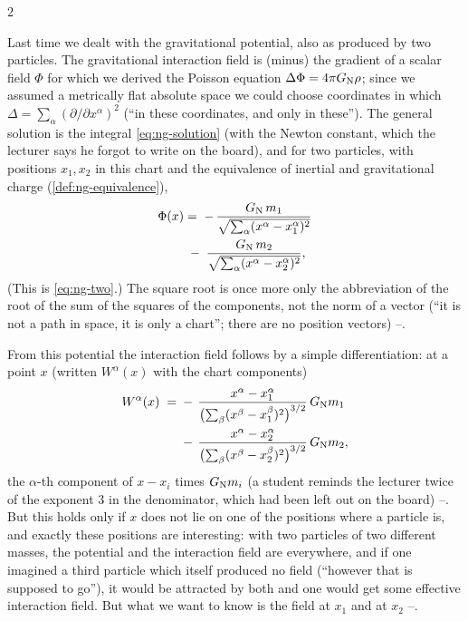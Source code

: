 \begin{paracol}{2}
\begin{recall}
Last time we dealt with the gravitational potential, also as produced by two particles. The gravitational interaction field is (minus) the gradient of a scalar field $\Phi$ for which we derived the Poisson equation $\Delta\Phi=4\pi G_{\rm N}\rho$; since we assumed a metrically flat absolute space we could choose coordinates in which $\Delta=\sum_\alpha(\partial/\partial x^\alpha)^2$ (``in these coordinates, and only in these'').
The general solution is the integral \eqref{eq:ng-solution} (with the Newton constant, which the lecturer says he forgot to write on the board), and for two particles, with positions $x_1,x_2$ in this chart and the equivalence of inertial and gravitational charge (\cref{def:ng-equivalence}),
\[
  \begin{aligned}\Phi(x)&=\;-\,\frac{G_{\rm N}\,m_1}{\sqrt{\sum_\alpha(x^\alpha-x_1^\alpha)^2}}\\&\;-\;\frac{G_{\rm N}\,m_2}{\sqrt{\sum_\alpha(x^\alpha-x_2^\alpha)^2}},\end{aligned}
\] (This is \eqref{eq:ng-two}.)
The square root is once more only the abbreviation of the root of the sum of the squares of the components, not the norm of a vector (``it is not a path in space, it is only a chart''; there are no position vectors) --.
\end{recall}

From this potential the interaction field follows by a simple differentiation: at a point $x$ (written $W^\alpha(x)$ with the chart components)
\begin{equation}\label{eq:tb-field}
  \begin{aligned}W^\alpha(x)\;=\;&-\,\frac{x^\alpha-x_1^\alpha}{\bigl(\sum_\beta(x^\beta-x_1^\beta)^2\bigr)^{3/2}}\,G_{\rm N}m_1\\&-\,\frac{x^\alpha-x_2^\alpha}{\bigl(\sum_\beta(x^\beta-x_2^\beta)^2\bigr)^{3/2}}\,G_{\rm N}m_2 ,\end{aligned}
\end{equation}
the $\alpha$-th component of $x-x_i$ times $G_{\rm N}m_i$ (a student reminds the lecturer twice of the exponent $3$ in the denominator, which had been left out on the board) --. But this holds only if $x$ does not lie on one of the positions where a particle is, and exactly these positions are interesting: with two particles of two different masses, the potential and the interaction field are everywhere, and if one imagined a third particle
which itself produced no field (``however that is supposed to go''), it would be attracted by both and one would get some effective interaction field. But what we want to know is the field at $x_1$ and at $x_2$ --.


\end{paracol}
